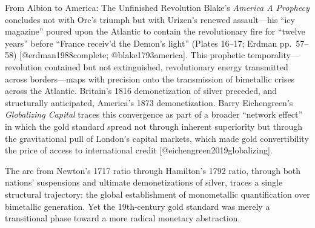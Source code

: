 \documentclass[
  ignorenonframetext,
]{beamer}
\begin{document}
\begin{frame}{From Albion to America: The Unfinished Revolution}
\protect{}\label{from-albion-to-america-the-unfinished-revolution}
Blake's \emph{America A Prophecy} concludes not with Orc's triumph but
with Urizen's renewed assault---his ``icy magazine'' poured upon the
Atlantic to contain the revolutionary fire for ``twelve years'' before
``France receiv'd the Demon's light'' (Plates 16--17; Erdman pp.~57--58)
{[}@erdman1988complete; @blake1793america{]}. This prophetic
temporality---revolution contained but not extinguished, revolutionary
energy transmitted across borders---maps with precision onto the
transmission of bimetallic crises across the Atlantic. Britain's 1816
demonetization of silver preceded, and structurally anticipated,
America's 1873 demonetization. Barry Eichengreen's \emph{Globalizing
Capital} traces this convergence as part of a broader ``network effect''
in which the gold standard spread not through inherent superiority but
through the gravitational pull of London's capital markets, which made
gold convertibility the price of access to international credit
{[}@eichengreen2019globalizing{]}.

The arc from Newton's 1717 ratio through Hamilton's 1792 ratio, through
both nations' suspensions and ultimate demonetizations of silver, traces
a single structural trajectory: the global establishment of monometallic
quantification over bimetallic generation. Yet the 19th-century gold
standard was merely a transitional phase toward a more radical monetary
abstraction.
\end{frame}
\end{document}
